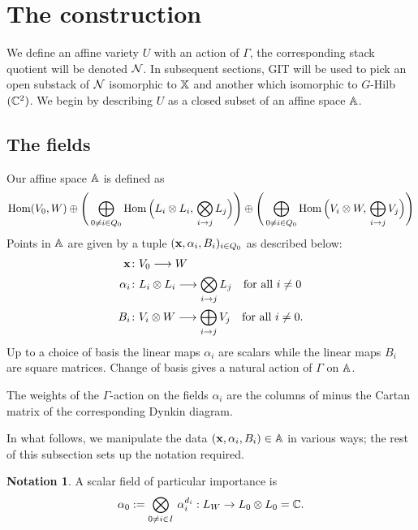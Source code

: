 \documentclass{amsart}
\theoremstyle{definition}
\newtheorem{notn}[theorem]{Notation}
\begin{document}
\section{The construction}

We define an affine variety $U$ with an action of $\Gamma$, the corresponding stack quotient will be denoted $\mathcal{N}$.
In subsequent sections, GIT will be used to pick an open substack of $\mathcal{N}$ isomorphic to $\mathbb{X}$ and another which isomorphic to $G$-Hilb$(\mathbb{C}^2)$.
We begin by describing $U$ as a closed subset of an affine space $\mathbb{A}$.

\subsection{The fields}
Our affine space $\mathbb{A}$ is defined as
\begin{equation*}
    \operatorname{Hom}(V_0,W) \oplus \Bigg(\bigoplus_{0\neq i \in Q_0} \operatorname{Hom}\Big(L_i \otimes L_i,\, \bigotimes_{i \rightarrow j} L_j\Big) \Bigg) \oplus  \Bigg(\bigoplus_{0\neq i \in Q_0} \operatorname{Hom}\Big(V_i \otimes W,\, \bigoplus_{i \rightarrow j} V_j\Big) \Bigg)
\end{equation*}
Points in $\mathbb{A}$ are given by a tuple $(\mathbf{x},\alpha_i, B_i)_{i \in Q_0}$ as described below:
\begin{align}
\mathbf{x} \colon &V_0 \longrightarrow W \label{fd:x} \\
\alpha_i \colon &L_i \otimes L_i \longrightarrow \bigotimes_{i \rightarrow j} L_j \quad \text{for all} \,\, i\neq 0 \label{fd:alpha} \\
 B_i \colon &V_i \otimes W \longrightarrow \bigoplus_{i \rightarrow j} V_j \quad \text{for all} \,\, i\neq 0. \label{fd:B}
\end{align}
Up to a choice of basis the linear maps $\alpha_i$ are scalars while the linear maps $B_i$ are square matrices.
Change of basis gives a natural action of $\Gamma$ on $\mathbb{A}$.

\begin{remark}\label{rm:cartan}
The weights of the $\Gamma$-action on the fields $\alpha_i$ are the columns of minus the Cartan matrix of the corresponding Dynkin diagram.
\end{remark}

In what follows, we manipulate the data $(\mathbf{x}, \alpha_i, B_i) \in \mathbb{A}$ in various ways; the rest of this subsection sets up the notation required.

\begin{notn}
A scalar field of particular importance is $$\alpha_0:= \bigotimes_{0 \neq i \in I} \,\alpha_i^{d_i}: L_W \rightarrow L_0 \otimes L_0 = \mathbb{C}.$$
\end{notn}
\end{document}
